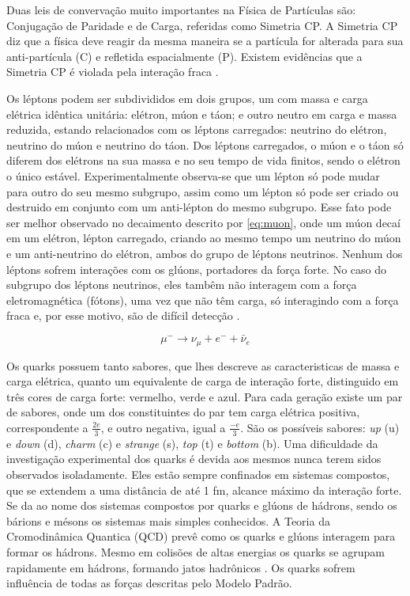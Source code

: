 Duas leis de convervação muito importantes na Física de
Partículas são: Conjugação de Paridade e de Carga, referidas como Simetria CP. 
A Simetria CP diz que a física deve reagir
da mesma maneira se a partícula for alterada para sua anti-partícula (C) e refletida
espacialmente (P). Existem evidências que a Simetria CP é violada pela interação fraca \cite{Intro_Nuclear}.

Os léptons podem ser subdivididos em dois grupos, 
um com massa e carga elétrica idêntica unitária: elétron, múon e táon; 
e outro neutro em carga e massa reduzida, estando relacionados com os léptons
carregados: neutrino do elétron, neutrino do múon e neutrino do táon. Dos
léptons carregados, o múon e o táon só diferem dos elétrons na sua massa e no
seu tempo de vida finitos, sendo o elétron o único estável.
Experimentalmente observa-se que um lépton só pode mudar para outro do seu mesmo
subgrupo, assim como um lépton só pode ser criado ou destruido em conjunto com
um anti-lépton do mesmo subgrupo. Esse fato pode ser melhor observado no
decaimento descrito por \ref{eq:muon}, onde um múon decaí em um
elétron, lépton carregado, criando ao mesmo tempo um neutrino do múon e um
anti-neutrino do elétron, ambos do grupo de léptons neutrinos.
Nenhum dos léptons sofrem interações com os glúons, portadores da força forte.
No caso do subgrupo dos léptons neutrinos, eles tambêm não interagem com a força eletromagnética (fótons), 
uma vez que não têm carga, só interagindo com a força fraca e, por esse motivo,
são de difícil detecção \cite{Intro_Nuclear,Intro_Standard}.

\begin{equation} \label{eq:muon}
\mu^{-} \rightarrow \nu_{\mu} + e^- + \bar{\nu}_{e}
\end{equation}

Os quarks possuem tanto sabores, que lhes descreve as caracteristicas de massa e
carga elétrica, quanto um equivalente de carga de interação
forte, distinguido em três cores de carga forte: vermelho, verde e azul. 
Para cada geração existe um par de sabores, onde um dos constituintes do par tem
carga elétrica positiva, correspondente a $\frac{2e}{3}$,
e outro negativa, igual a $\frac{-e}{3}$. São os possíveis sabores: \emph{up}
(u) e \emph{down} (d), \emph{charm} (c) e \emph{strange} (s), \emph{top} (t) e
\emph{bottom} (b). 
Uma dificuldade da investigação experimental dos quarks é devida aos mesmos
nunca terem sidos observados isoladamente. Eles estão sempre confinados em sistemas
compostos, que se extendem a uma distância de até 1 fm, alcance máximo da
interação forte. Se da ao nome dos sistemas compostos por quarks e glúons de
hádrons, sendo os bárions e mésons os sistemas mais simples conhecidos. 
A Teoria da Cromodinâmica Quantica (QCD) prevê como os quarks e glúons 
interagem para formar os hádrons. Mesmo
em colisões de altas energias os quarks se agrupam rapidamente em hádrons,
formando jatos hadrônicos \cite{Intro_Nuclear}.
Os quarks sofrem influência de todas as forças descritas pelo Modelo Padrão.
 
